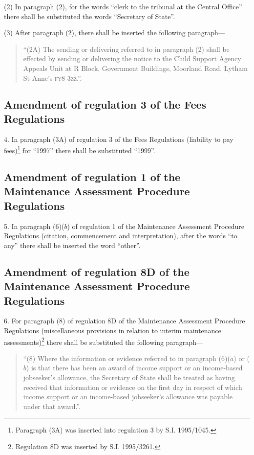 \documentclass[12pt,a4paper]{article}
\begin{document}
(2) In paragraph (2), for the words “clerk to the tribunal at the Central Office” there shall be substituted the words “Secretary of State”.

(3) After paragraph (2), there shall be inserted the following paragraph—
\begin{quotation}
“(2A) The sending or delivering referred to in paragraph (2) shall be effected by sending or delivering the notice to the Child Support Agency Appeals Unit at R Block, Government Buildings, Moorland Road, Lytham St Anne’s \textsc{\lowercase{FY8 3ZZ}}.”.
\end{quotation}

\subsection[4. Amendment of regulation 3 of the Fees Regulations]{Amendment of regulation 3 of the Fees Regulations}

4.  In paragraph (3A) of regulation 3 of the Fees Regulations (liability to pay fees)\footnote{\frenchspacing Paragraph (3A) was inserted into regulation 3 by S.I. 1995/1045.} for “1997” there shall be substituted “1999”.

\subsection[5. Amendment of regulation 1 of the Maintenance Assessment Procedure Regulations]{\sloppy Amendment of regulation 1 of the Maintenance Assessment Procedure Regulations}

5.  In paragraph (6)($b$) of regulation 1 of the Maintenance Assessment Procedure Regulations (citation, commencement and interpretation), after the words “to any” there shall be inserted the word “other”.

\subsection[6. Amendment of regulation 8D of the Maintenance Assessment Procedure Regulations]{Amendment of regulation 8D of the Maintenance Assessment Procedure Regulations}

6.  For paragraph (8) of regulation 8D of the Maintenance Assessment Procedure Regulations (miscellaneous provisions in relation to interim maintenance assessments)\footnote{\frenchspacing Regulation 8D was inserted by S.I. 1995/3261.} there shall be substituted the following paragraph—
\begin{quotation}
“(8) Where the information or evidence referred to in paragraph (6)($a$) or ($b$) is that there has been an award of income support or an income-based jobseeker’s allowance, the Secretary of State shall be treated as having received that information or evidence on the first day in respect of which income support or an income-based jobseeker’s allowance was payable under that award.”.
\end{quotation}
\end{document}
